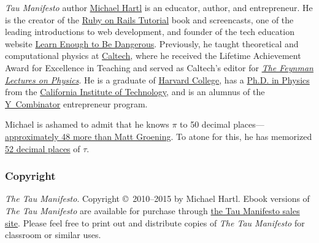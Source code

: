 
\emph{Tau Manifesto} author \href{http://www.michaelhartl.com/}{Michael Hartl} is an educator, author, and entrepreneur. He is the creator of the \href{http://www.railstutorial.org/}{Ruby on Rails Tutorial} book and screencasts, one of the leading introductions to web development, and founder of the tech education website \href{http://learnenough.com/}{Learn Enough to Be Dangerous}. Previously, he taught theoretical and computational physics at  \href{http://www.caltech.edu/}{Caltech}, where he received the Lifetime Achievement Award for Excellence in Teaching and served as Caltech's editor for \href{http://www.feynmanlectures.caltech.edu/}{\emph{The Feynman Lectures on Physics}}. He is a graduate of \href{http://college.harvard.edu/}{Harvard College}, has a \href{http://thesis.library.caltech.edu/1940/}{Ph.D. in Physics} from the \href{http://www.caltech.edu/}{California Institute of Technology}, and is an alumnus of the \href{http://ycombinator.com/}{Y~Combinator} entrepreneur program.

Michael is ashamed to admit that he knows $\pi$ to 50 decimal places---\href{\#fig-futurama_video}{ap\-prox\-imately 48 more than Matt Groening}. To atone for this, he has memorized \href{http://www.wolframalpha.com/input/?i=N[2+Pi,+53]}{52 decimal places} of $\tau$.

    \subsubsection{Copyright} %
    \label{sec:copyright_and_license}

    \emph{The Tau Manifesto}. Copyright \copyright\ 2010--2015 by Michael Hartl. Ebook versions of \emph{The Tau Manifesto} are available for purchase through \href{http://sales.tauday.com/}{the Tau Manifesto sales site}. Please feel free to print out and distribute copies of \emph{The Tau Manifesto} for classroom or similar uses.

